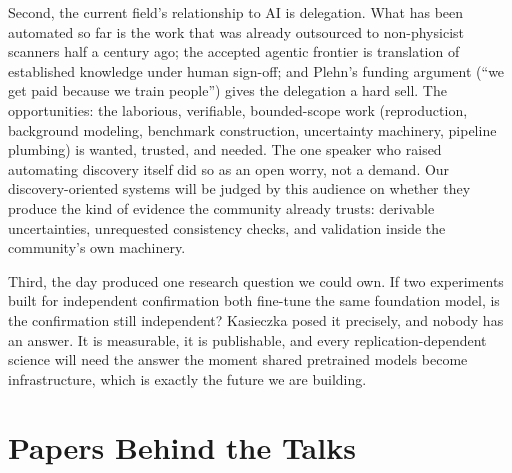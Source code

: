 \documentclass[11pt]{article}
\begin{document}
Second, the current field's relationship to AI is delegation. What has been automated so far is the work that was already outsourced to non-physicist scanners half a century ago; the accepted agentic frontier is translation of established knowledge under human sign-off; and Plehn's funding argument (``we get paid because we train people'') gives the delegation a hard sell. The opportunities: the laborious, verifiable, bounded-scope work (reproduction, background modeling, benchmark construction, uncertainty machinery, pipeline plumbing) is wanted, trusted, and needed. The one speaker who raised automating discovery itself did so as an open worry, not a demand. Our discovery-oriented systems will be judged by this audience on whether they produce the kind of evidence the community already trusts: derivable uncertainties, unrequested consistency checks, and validation inside the community's own machinery.

Third, the day produced one research question we could own. If two experiments built for independent confirmation both fine-tune the same foundation model, is the confirmation still independent? Kasieczka posed it precisely, and nobody has an answer. It is measurable, it is publishable, and every replication-dependent science will need the answer the moment shared pretrained models become infrastructure, which is exactly the future we are building.

\section*{Papers Behind the Talks}
\end{document}

